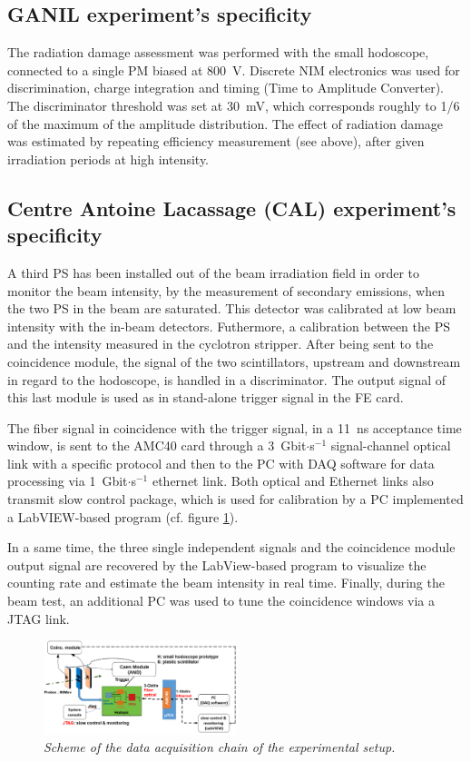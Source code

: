 \documentclass[a4paper,11pt]{article}
\begin{document}
\subsection{GANIL experiment's specificity}

The radiation damage assessment was performed with the small hodoscope, connected to a single PM biased at 800~V. Discrete NIM electronics was used for discrimination, charge integration and timing (Time to Amplitude Converter). The discriminator threshold was set at 30~mV, which corresponds roughly to 1/6 of the maximum of the amplitude distribution. The effect of radiation damage was estimated by repeating efficiency measurement (see above), after given irradiation periods at high intensity.

\subsection{Centre Antoine Lacassage (CAL) experiment's specificity}
\label{In-beam_tests}

A third PS has been installed out of the beam irradiation field in order to monitor the beam intensity, by the measurement of secondary emissions, when the two PS in the beam are saturated. This detector was calibrated at low beam intensity with the in-beam detectors. Futhermore, a calibration between the PS and the intensity measured in the cyclotron stripper. After being sent to the coincidence module, the signal of the two scintillators, upstream and downstream in regard to the hodoscope, is handled in a discriminator. The output signal of this last module is used as in stand-alone trigger signal in the FE card. 

The fiber signal in coincidence with the trigger signal, in a 11~ns acceptance time window, is sent to the AMC40 card through a 3~Gbit$\cdot$s$^{-1}$ signal-channel optical link with a specific protocol and then to the PC with DAQ software for data processing via 1~Gbit$\cdot$s$^{-1}$ ethernet link. Both optical and Ethernet links also transmit slow control package, which is used for calibration by a PC implemented a LabVIEW-based program (cf. figure \ref{fig:Scheme_Setup_hodo}). 

In a same time, the three single independent signals and the coincidence module output signal are recovered by the LabView-based program to visualize the counting rate and estimate the beam intensity in real time.
Finally, during the beam test, an additional PC was used to tune the coincidence windows via a JTAG link.
\begin{figure}[H]
\centering
\includegraphics[width=0.5\textwidth]{figures/Scheme_Setup_Nice_08_2019.pdf}
\caption{\small{\textit{Scheme of the data acquisition chain of the experimental setup.}}}
\label{fig:Scheme_Setup_hodo}
\end{figure}
\end{document}
